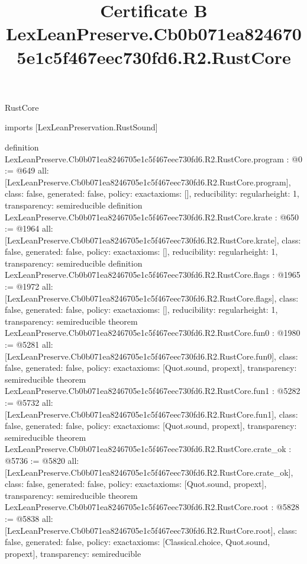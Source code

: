 \begin{lexlean}{RustCore}
\title{Certificate B LexLeanPreserve.Cb0b071ea8246705e1c5f467eec730fd6.R2.RustCore}
\begin{coremodule}
imports [LexLeanPreservation.RustSound]

definition LexLeanPreserve.Cb0b071ea8246705e1c5f467eec730fd6.R2.RustCore.program : @0 := @649 {
  all: [LexLeanPreserve.Cb0b071ea8246705e1c5f467eec730fd6.R2.RustCore.program],
  class: false,
  generated: false,
  policy: exact{axioms: []},
  reducibility: regular{height: 1},
  transparency: semireducible
}
definition LexLeanPreserve.Cb0b071ea8246705e1c5f467eec730fd6.R2.RustCore.krate : @650 := @1964 {
  all: [LexLeanPreserve.Cb0b071ea8246705e1c5f467eec730fd6.R2.RustCore.krate],
  class: false,
  generated: false,
  policy: exact{axioms: []},
  reducibility: regular{height: 1},
  transparency: semireducible
}
definition LexLeanPreserve.Cb0b071ea8246705e1c5f467eec730fd6.R2.RustCore.flags : @1965 := @1972 {
  all: [LexLeanPreserve.Cb0b071ea8246705e1c5f467eec730fd6.R2.RustCore.flags],
  class: false,
  generated: false,
  policy: exact{axioms: []},
  reducibility: regular{height: 1},
  transparency: semireducible
}
theorem LexLeanPreserve.Cb0b071ea8246705e1c5f467eec730fd6.R2.RustCore.fun0 : @1980 := @5281 {
  all: [LexLeanPreserve.Cb0b071ea8246705e1c5f467eec730fd6.R2.RustCore.fun0],
  class: false,
  generated: false,
  policy: exact{axioms: [Quot.sound, propext]},
  transparency: semireducible
}
theorem LexLeanPreserve.Cb0b071ea8246705e1c5f467eec730fd6.R2.RustCore.fun1 : @5282 := @5732 {
  all: [LexLeanPreserve.Cb0b071ea8246705e1c5f467eec730fd6.R2.RustCore.fun1],
  class: false,
  generated: false,
  policy: exact{axioms: [Quot.sound, propext]},
  transparency: semireducible
}
theorem LexLeanPreserve.Cb0b071ea8246705e1c5f467eec730fd6.R2.RustCore.crate_ok : @5736 := @5820 {
  all: [LexLeanPreserve.Cb0b071ea8246705e1c5f467eec730fd6.R2.RustCore.crate_ok],
  class: false,
  generated: false,
  policy: exact{axioms: [Quot.sound, propext]},
  transparency: semireducible
}
theorem LexLeanPreserve.Cb0b071ea8246705e1c5f467eec730fd6.R2.RustCore.root : @5828 := @5838 {
  all: [LexLeanPreserve.Cb0b071ea8246705e1c5f467eec730fd6.R2.RustCore.root],
  class: false,
  generated: false,
  policy: exact{axioms: [Classical.choice, Quot.sound, propext]},
  transparency: semireducible
}


\end{coremodule}
\end{lexlean}
